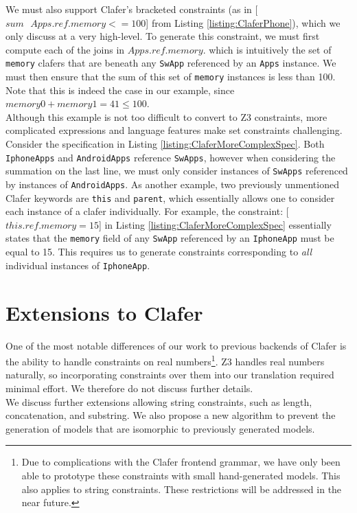 \documentclass{easychair}
\begin{document}
We must also support Clafer's bracketed constraints (as in [$sum\text{ }Apps.ref.memory <= 100$] from Listing \ref{listing:ClaferPhone}), which we only discuss at a very high-level. To generate this constraint, we must first compute each of the joins in $Apps.ref.memory$. which is intuitively the set of \texttt{memory} clafers that are beneath any \texttt{SwApp} referenced by an \texttt{Apps} instance. We must then ensure that the sum of this set of \texttt{memory} instances is less than 100. Note that this is indeed the case in our example, since $memory0 + memory1 =   41 \le 100$.\\
\indent Although this example is not too difficult to convert to Z3 constraints, more complicated expressions and language features make set constraints challenging. Consider the specification in Listing \ref{listing:ClaferMoreComplexSpec}. Both \texttt{IphoneApps} and \texttt{AndroidApps} reference \texttt{SwApps}, however when considering the summation on the last line, we must only consider instances of \texttt{SwApps} referenced by instances of \texttt{AndroidApps}. As another example, two previously unmentioned Clafer keywords are \texttt{this} and \texttt{parent}, which essentially allows one to consider each instance of a clafer individually. For example, the constraint: [$this.ref.memory = 15$] in Listing \ref{listing:ClaferMoreComplexSpec}  essentially states that the \texttt{memory} field of any \texttt{SwApp} referenced by an \texttt{IphoneApp} must be equal to 15. This requires us to generate constraints corresponding to \textit{all} individual instances of \texttt{IphoneApp}.

\section{Extensions to Clafer}
One of the most notable differences of our work to previous backends of Clafer is the ability to handle constraints on real numbers\footnote{Due to complications with the Clafer frontend grammar, we have only been able to prototype these constraints with small hand-generated models. This also applies to string constraints. These restrictions will be addressed in the near future.}. Z3 handles real numbers naturally, so incorporating constraints over them into our translation required minimal effort. We therefore do not discuss further details. \\
\indent We discuss further extensions allowing string constraints, such as length, concatenation, and substring. We also propose a new algorithm to prevent the generation of models that are isomorphic to previously generated models.
\end{document}
